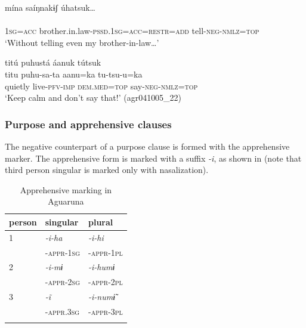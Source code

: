 \documentclass[output=paper,colorlinks,citecolor=brown,draft]{langscibook}
\begin{document}
\ea\label{ex:agu:34}
    \glll mína saíŋnakɨʃ úhatsuk… \\ 
          [mi=na  sai-hu=na=kɨ=ʃa uha-tsu-u=ka]\\
          \textsc{1sg}=\textsc{acc}  brother.in.law-\textsc{pssd.1sg=acc=restr=add} tell-\textsc{neg-nmlz=top}\\
    \glt  ‘Without telling even my brother-in-law…’ \citep[192]{Overall2017a}
\z 

\ea\label{ex:agu:35}
    \glll titú puhustá áanuk tútsuk \\ 
          titu  puhu-sa-ta  aanu=ka  tu-tsu-u=ka \\
          quietly  live-\textsc{pfv-imp}  \textsc{dem}.\textsc{med=top}  say-\textsc{neg-nmlz=top} \\
    \glt ‘Keep calm and don’t say that!’ (agr041005\_22)
\z 

\subsubsection{Purpose and apprehensive clauses}\label{sec:agu:2.4.3}

The negative counterpart of a purpose clause is formed with the apprehensive marker. The apprehensive form is marked with a suffix \textit{\nobreakdash-i}, as shown in  (note that third person singular is marked only with nasalization).

\begin{table}
\begin{tabular}{lll}
\lsptoprule
{person} & {singular} & {plural}\\
\midrule 
{1} & \textit{-i-ha} & \textit{-i-hi}\\
& {\scshape -appr-1sg} & {\scshape -appr-1pl}\\
{2} & \textit{-i-mɨ} & \textit{-i-humɨ}\\
& {\scshape -appr-2sg} & {\scshape -appr-2pl}\\
{3} & \textit{-ĩ} & \textit{-i-numɨ̃}\\
& {\scshape -appr.3sg} & {\scshape -appr-3pl}\\
\lspbottomrule
\end{tabular}
\caption{Apprehensive marking in Aguaruna \citep[73]{Overall2017b}}
\label{tab:agu:3}
\end{table}
\end{document}
